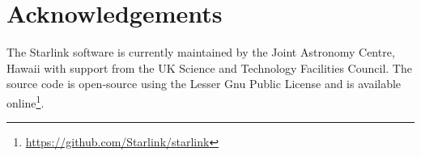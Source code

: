 \documentclass[final,authoryear,5p,times,twocolumn]{elsarticle}
\begin{document}
\section{Acknowledgements}

The Starlink software is currently maintained by the Joint Astronomy
Centre, Hawaii with support from the UK Science and Technology
Facilities Council. The source code is open-source using the Lesser
Gnu Public License and is available
online\footnote{\url{https://github.com/Starlink/starlink}}.




\end{document}
